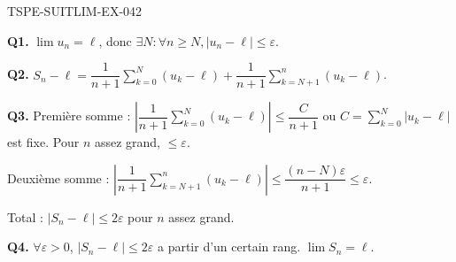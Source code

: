 \begin{corrige}{TSPE-SUITLIM-EX-042}

\textbf{Q1.} $\lim u_n = \ell$, donc $\exists N : \forall n \geq N, |u_n-\ell| \leq \varepsilon$.

\textbf{Q2.} $S_n - \ell = \dfrac{1}{n+1}\sum_{k=0}^N(u_k-\ell) + \dfrac{1}{n+1}\sum_{k=N+1}^n(u_k-\ell)$.

\textbf{Q3.} Première somme : $\left|\dfrac{1}{n+1}\sum_{k=0}^N(u_k-\ell)\right| \leq \dfrac{C}{n+1}$ ou $C = \sum_{k=0}^N|u_k-\ell|$ est fixe. Pour $n$ assez grand, $\leq \varepsilon$.

Deuxième somme : $\left|\dfrac{1}{n+1}\sum_{k=N+1}^n(u_k-\ell)\right| \leq \dfrac{(n-N)\varepsilon}{n+1} \leq \varepsilon$.

Total : $|S_n-\ell| \leq 2\varepsilon$ pour $n$ assez grand.

\textbf{Q4.} $\forall \varepsilon > 0$, $|S_n - \ell| \leq 2\varepsilon$ a partir d'un certain rang. $\boxed{\lim S_n = \ell}$.

\end{corrige}
